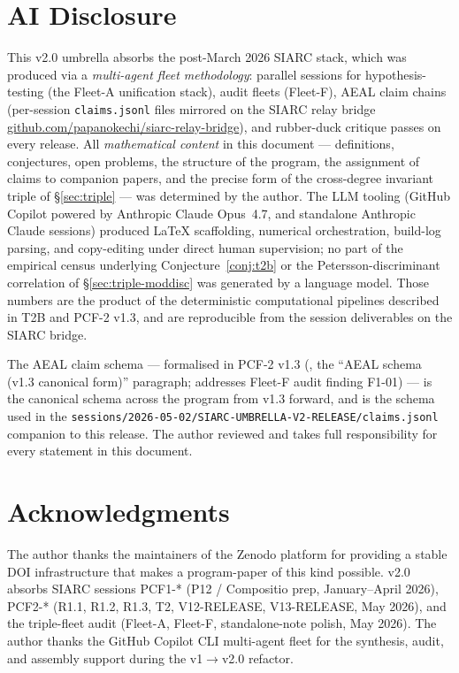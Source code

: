 \documentclass[11pt,a4paper]{article}
\theoremstyle{definition}
\theoremstyle{remark}
\begin{document}
\section{AI Disclosure}
\label{sec:ai}

This v2.0 umbrella absorbs the post-March 2026 SIARC stack, which was
produced via a \emph{multi-agent fleet methodology}: parallel sessions
for hypothesis-testing (the Fleet-A unification stack), audit fleets
(Fleet-F), AEAL claim chains (per-session
\texttt{claims.jsonl} files mirrored on the SIARC relay bridge
\href{https://github.com/papanokechi/siarc-relay-bridge}{github.com/papanokechi/siarc-relay-bridge}),
and rubber-duck critique passes on every release. All
\emph{mathematical content} in this document --- definitions,
conjectures, open problems, the structure of the program, the assignment
of claims to companion papers, and the precise form of the cross-degree
invariant triple of \S\ref{sec:triple} --- was determined by the author.
The LLM tooling (GitHub Copilot powered by Anthropic Claude Opus~4.7,
and standalone Anthropic Claude sessions) produced LaTeX scaffolding,
numerical orchestration, build-log parsing, and copy-editing under
direct human supervision; no part of the empirical census underlying
Conjecture~\ref{conj:t2b} or the Petersson-discriminant correlation of
\S\ref{sec:triple-moddisc} was generated by a language model. Those
numbers are the product of the deterministic computational pipelines
described in T2B and PCF-2 v1.3, and are reproducible from the session
deliverables on the SIARC bridge.

The AEAL claim schema --- formalised in PCF-2 v1.3 (\cite{PCF2}, the
``AEAL schema (v1.3 canonical form)'' paragraph; addresses Fleet-F
audit finding F1-01) --- is the canonical schema across the program
from v1.3 forward, and is the schema used in the
\texttt{sessions/2026-05-02/SIARC-UMBRELLA-V2-RELEASE/claims.jsonl}
companion to this release. The author reviewed and takes full
responsibility for every statement in this document.

\section*{Acknowledgments}
The author thanks the maintainers of the Zenodo platform for providing
a stable DOI infrastructure that makes a program-paper of this kind
possible. v2.0 absorbs SIARC sessions PCF1-* (P12 / Compositio prep,
January--April 2026), PCF2-* (R1.1, R1.2, R1.3, T2, V12-RELEASE,
V13-RELEASE, May 2026), and the triple-fleet audit
(Fleet-A, Fleet-F, standalone-note polish, May 2026). The author
thanks the GitHub Copilot CLI multi-agent fleet for the synthesis,
audit, and assembly support during the v1$\to$v2.0 refactor.
\end{document}
